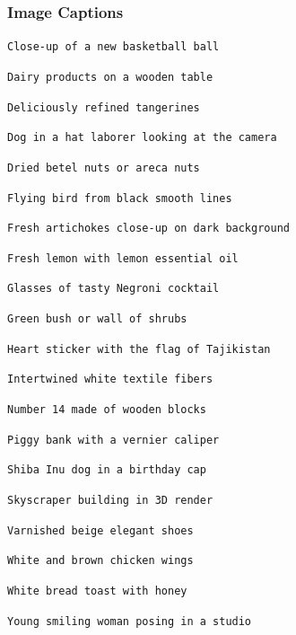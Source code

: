 \subsubsection{Image Captions}
\begin{enumerate}[noitemsep]
    {\promptExampleSize \item \texttt{Close-up of a new basketball ball}}
    {\promptExampleSize \item \texttt{Dairy products on a wooden table}}
    {\promptExampleSize \item \texttt{Deliciously refined tangerines}}
    {\promptExampleSize \item \texttt{Dog in a hat laborer looking at the camera}}
    {\promptExampleSize \item \texttt{Dried betel nuts or areca nuts}}
    {\promptExampleSize \item \texttt{Flying bird from black smooth lines}}
    {\promptExampleSize \item \texttt{Fresh artichokes close-up on dark background}}
    {\promptExampleSize \item \texttt{Fresh lemon with lemon essential oil}}
    {\promptExampleSize \item \texttt{Glasses of tasty Negroni cocktail}}
    {\promptExampleSize \item \texttt{Green bush or wall of shrubs}}
    {\promptExampleSize \item \texttt{Heart sticker with the flag of Tajikistan}}
    {\promptExampleSize \item \texttt{Intertwined white textile fibers}}
    {\promptExampleSize \item \texttt{Number 14 made of wooden blocks}}
    {\promptExampleSize \item \texttt{Piggy bank with a vernier caliper}}
    {\promptExampleSize \item \texttt{Shiba Inu dog in a birthday cap}}
    {\promptExampleSize \item \texttt{Skyscraper building in 3D render}}
    {\promptExampleSize \item \texttt{Varnished beige elegant shoes}}
    {\promptExampleSize \item \texttt{White and brown chicken wings}}
    {\promptExampleSize \item \texttt{White bread toast with honey}}
    {\promptExampleSize \item \texttt{Young smiling woman posing in a studio}}
\end{enumerate}



